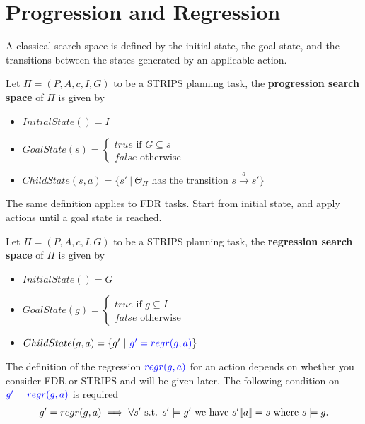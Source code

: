 \documentclass[10pt, letterpaper]{report}
\begin{document}
 \section{Progression and Regression}
 A classical search space is defined by the initial state, the goal state, and the transitions between the states generated by an applicable action.
 \begin{definition}
    Let $\Pi=(P,A,c,I,G)$ to be a STRIPS planning task, the \textbf{progression search space} of $\Pi$ is given by\begin{itemize}
        \item $InitialState() = I$
        \item $GoalState(s)=\begin{cases}
            true \text{ if }G\subseteq s \\ 
            false \text{ otherwise}
        \end{cases}$
        \item $ChildState(s,a)=\{s' \ | \ \Theta_\Pi \text{ has the transition }s\xrightarrow{a}s'\}$
    \end{itemize}
 \end{definition}
 The same definition applies to FDR tasks.
 Start from initial state, and apply actions until a goal state is reached.
 \begin{definition}
     Let $\Pi=(P,A,c,I,G)$ to be a STRIPS planning task, the \textbf{regression search space} of $\Pi$ is given by\begin{itemize}
        \item $InitialState() = G$
        \item $GoalState(g)=\begin{cases}
            true \text{ if }g\subseteq I \\ 
            false \text{ otherwise}
        \end{cases}$
         \item $ChildState(g,a)=\{g' \ | \ \blueText{g'=regr(g,a)}\}$
     \end{itemize}
 \end{definition}
 The definition of the regression $\color{blue}regr(g,a)\color{black}$ for an action depends on whether you consider FDR or STRIPS and will be given later.
 The following condition on $\color{blue}g'=regr(g,a)\color{black}$ is required\begin{align}\label{regr_cond}
 g'=regr(g,a)\implies \forall s' \text{ s.t. }s'\models g' \text{ we have } s'\llbracket a \rrbracket=s \text{ where }s\models g.
 \end{align}
\end{document}
